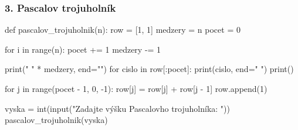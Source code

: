 \subsubsection*{3. Pascalov trojuholník}
\begin{solution}
def pascalov_trojuholnik(n):
    row = [1, 1]
    medzery = n
    pocet = 0

    for i in range(n):
        pocet += 1
        medzery -= 1

        print(" " * medzery, end="")
        for cislo in row[:pocet]:
            print(cislo, end=" ")
        print()

        for j in range(pocet - 1,  0, -1):
            row[j] = row[j] + row[j - 1]
        row.append(1)

vyska = int(input("Zadajte výšku Pascalovho trojuholníka: "))
pascalov_trojuholnik(vyska)
\end{solution}

